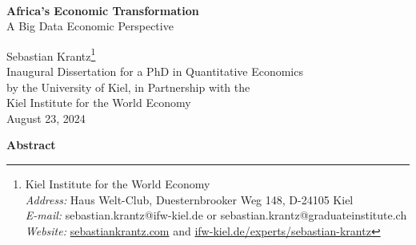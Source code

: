 \documentclass[openany]{book}
\begin{document}
\begin{titlepage}
    \begin{center}
        \hphantom{a}\\
        \Huge\textbf{Africa's Economic Transformation}\\A Big Data Economic Perspective
        
        \vspace{1cm}
        \Large Sebastian Krantz\footnote{Kiel Institute for the World Economy\\ \textit{Address:} Haus Welt-Club, Duesternbrooker Weg 148, D-24105 Kiel\\ \textit{E-mail:} sebastian.krantz@ifw-kiel.de or sebastian.krantz@graduateinstitute.ch\\ \textit{Website:} \href{https://sebastiankrantz.com}{sebastiankrantz.com} and \href{https://www.ifw-kiel.de/experts/sebastian-krantz/}{ifw-kiel.de/experts/sebastian-krantz}}\\[1em]Inaugural Dissertation for a PhD in Quantitative Economics\\by the University of Kiel, in Partnership with the\\Kiel Institute for the World Economy
\\[1em]August 23, 2024
        
        
        \vspace{1.7cm} %
        \large \textbf{Abstract}
        

\end{center}
\end{titlepage}
\end{document}
